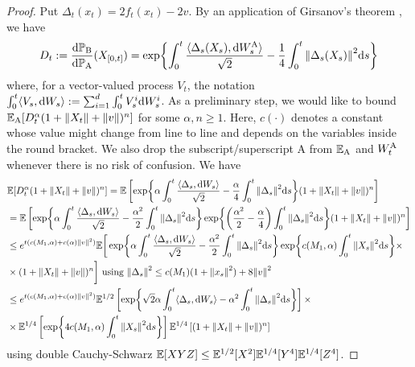 \documentclass{article}
\theoremstyle{plain}
\theoremstyle{definition}
\theoremstyle{remark}
\begin{document}
\begin{proof}
	Put $\Delta_t(x_t) = 2f_t(x_t) - 2v$. By an application of Girsanov's theorem \citep[Example 3, Section 6.2.3]{liptser1977book}, we have
	\begin{equation*}
		D_t := \frac{\dd \mathbb{P}_{\mathrm{B}}}{\dd \mathbb{P}_{\mathrm{A}}}(X_{[0,t]}) = \exp{\int_0^t \frac{\langle \Delta_s(X_s), \dd W^{\mathrm{A}}_s \rangle}{\sqrt 2} - \frac 14 \int_0^t \norm{\Delta_s(X_s)}^2 \dd s}
	\end{equation*}
	where, for a vector-valued process $V_t$, the notation $\int_0^t \langle V_s, \dd W_s \rangle := \sum_{i=1}^d \int_0^t V_s^i \dd W_s^i$.
	As a preliminary step, we would like to bound $\mathbb{E}_{\operatorname{A}}[D_t^{\alpha} (1+\norm{X_t} + \norm{v})^n]$ for some $\alpha, n \geq 1$. Here, $c(\cdot)$ denotes a constant whose value might change from line to line and depends on the variables inside the round bracket. We also drop the subscript/superscript A from $\mathbb{E}_{\operatorname{A}}$ and $W^{\mathrm{A}}_t$ whenever there is no risk of confusion. We have
	\newcommand{\ideltasws}{\int_0^t \spito{\Delta_s}{\dd W_s}}
	\newcommand{\ideltaswsbis}{\int_0^t \frac{\spito{\Delta_s}{\dd W_s}}{\sqrt 2}}
	\newcommand{\inormd}{\int_0^t \norm{\Delta_s}^2 \dd s}
	\newcommand{\inormx}{\int_0^t \norm{X_s}^2 \dd s}
	\newcommand{\polynormterm}{(1 + \norm{X_t} + \norm{v})^n}
	\begin{equation*}
		\begin{split}
			&\E[D_t^\alpha (1+\norm{X_t} + \norm{v})^n] = \E\ps{\exp{\alpha \ideltaswsbis - \frac \alpha 4 \inormd}\polynormterm} \\
			&= \E\ps{\exp{\alpha \ideltaswsbis - \frac{\alpha^2}{2} \inormd} \exp{\pr{
						\frac{\alpha^2}{2} - \frac \alpha 4
					} \inormd}\polynormterm} \\
			&\leq e^{t(c(M_1, \alpha) + c(\alpha) \norm{v}^2)} \E\bigg[\exp{\alpha \ideltaswsbis - \frac{\alpha^2}{2} \inormd} \exp{c(M_1, \alpha) \inormx} \times \\ &\times \polynormterm\bigg] \text{ using } \norm{\Delta_s}^2 \leq c(M_1)(1 + \norm{x_s}^2) + 8\norm{v}^2 \\
			&\leq e^{t(c(M_1, \alpha) + c(\alpha) \norm{v}^2)} \E^{1/2}\ps{\exp{\sqrt 2 \alpha \ideltasws - \alpha^2 \inormd}} \times \\ &\times \E^{1/4}\ps{\exp{4c(M_1, \alpha) \inormx}} \E^{1/4}\ps{\polynormterm}
		\end{split}
	\end{equation*}
	using double Cauchy-Schwarz $\mathbb{E}[XYZ] \leq \mathbb{E}^{1/2}[X^2] \mathbb{E}^{1/4}[Y^4] \mathbb{E}^{1/4}[Z^4]$.


\end{proof}
\end{document}
